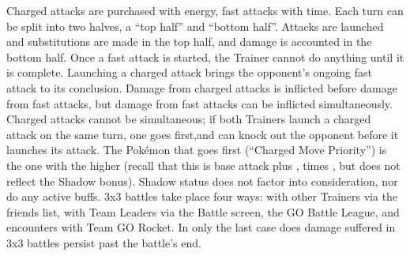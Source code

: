 Charged attacks are purchased with energy, fast attacks with time.
Each turn can be split into two halves, a ``top half'' and ``bottom half''.
Attacks are launched and substitutions are made in the top half, and damage is accounted in the bottom half.
Once a fast attack is started, the Trainer cannot do anything until it is complete.
Launching a charged attack brings the opponent's ongoing fast attack to its conclusion.
Damage from charged attacks is inflicted before damage from fast attacks,
  but damage from fast attacks can be inflicted simultaneously.
Charged attacks cannot be simultaneous; if both Trainers launch a charged attack
  on the same turn, one goes first,and can knock out the opponent before it
  launches its attack.
The Pokémon that goes first (``Charged Move Priority'') is the one with the
  higher  (recall that this is base attack plus , times \CPM, but does not reflect the Shadow bonus).
Shadow status does not factor into consideration, nor do any active buffs.
3x3 battles take place four ways: with other Trainers via the friends list,
 with Team Leaders via the Battle screen, the GO Battle League,
 and encounters with Team GO Rocket.
In only the last case does damage suffered in 3x3 battles persist past the battle's end.

